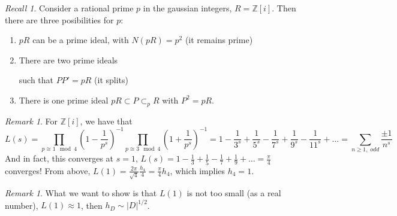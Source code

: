 \documentclass[12pt]{article}
\theoremstyle{definition}
\theoremstyle{remark}
\newtheorem{rmk}[thm]{Remark}
\newtheorem*{rec}{Recall}
\numberwithin{equation}{section}
\newcommand\Z{\mathbb Z}    %
\begin{document}
\vspace{15pt}

\begin{rec}
        Consider a rational prime $p$ in the gaussian integers, $R = \Z[i]$. Then there are three posibilities for $p$:\begin{enumerate}
                \item $pR$ can be a prime ideal, with $N(pR) = p^2$ (it remains prime)
                \item There are two prime ideals \begin{figure}  \end{figure} such that $PP' = pR$ (it splits)
                        \item There is one prime ideal $pR \subset P \subset_p R$ with $P^2 = pR$.
        \end{enumerate}
\end{rec}


\vspace{15pt}


\begin{rmk}
        For $\Z[i]$, we have that \begin{equation}
                L(s) = \prod\limits_{p\cong 1 \mod 4} \left(1-\frac{1}{p^s}\right)^{-1}\prod\limits_{p\cong 3 \mod 4} \left(1+\frac{1}{p^s}\right)^{-1} = 1 - \frac{1}{3^s} + \frac{1}{5^s} - \frac{1}{7^s} + \frac{1}{9^s}-\frac{1}{11^s} + \hdots = \sum\limits_{n\geq 1,\;odd}\frac{\pm 1}{n^s}
        \end{equation}
        And in fact, this converges at $s = 1$, $L(s) = 1 - \frac{1}{3} + \frac{1}{5} - \frac{1}{7} + \frac{1}{9} +\hdots = \frac{\pi}{4}$ converges! From above, $L(1) = \frac{2\pi}{\sqrt{4}}\frac{h_4}{4} = \frac{\pi}{4}h_4$, which implies $h_4 = 1$.
\end{rmk}


\vspace{15pt}


\begin{rmk}
        What we want to show is that $L(1)$ is not too small (as a real number), $L(1) \approx 1$, then $h_D \sim |D|^{1/2}$.
\end{rmk}


\vspace{15pt}
\end{document}
